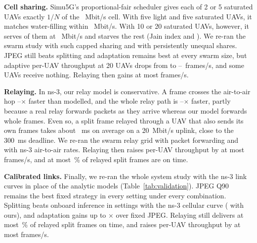 \documentclass[journal,twocolumn,10pt]{IEEEtran}
\begin{document}
\textbf{Cell sharing.} Simu5G's proportional-fair scheduler gives each of 2 or 5 saturated UAVs exactly $1/N$ of the \ValShareCell~Mbit/s cell. With five light and five saturated UAVs, it matches water-filling within \ValMixedMaxErr~Mbit/s. With 10 or 20 saturated UAVs, however, it serves \ValSharePfServed{} of them at \ValSharePfRate~Mbit/s and starves the rest (Jain index \ValShareJainTen{} and \ValShareJainTwenty). We re-ran the swarm study with such capped sharing and with persistently unequal shares. JPEG still beats splitting and adaptation remains best at every swarm size, but adaptive per-UAV throughput at 20 UAVs drops from \ValShareAdTwentyFair{} to \ValShareAdTwentyMin--\ValShareAdTwentyMax~frames/s, and some UAVs receive nothing. Relaying then gains at most \ValShareRelayGainMax{} frames/s.

\textbf{Relaying.} In ns-3, our relay model is conservative. A frame crosses the air-to-air hop \ValRelayHopMin--\ValRelayHopMax$\times$ faster than modelled, and the whole relay path is \ValRelayPathMin--\ValRelayPathMax$\times$ faster, partly because a real relay forwards packets as they arrive whereas our model forwards whole frames. Even so, a split frame relayed through a UAV that also sends its own frames takes about \ValRelaySplitOwnMs~ms on average on a 20~Mbit/s uplink, close to the 300~ms deadline. We re-ran the swarm relay grid with packet forwarding and with ns-3 air-to-air rates. Relaying then raises per-UAV throughput by at most \ValRelayFwdGainMax{} frames/s, and at most \ValRelayFwdSplitPct\,\% of relayed split frames are on time.

\textbf{Calibrated links.} Finally, we re-ran the whole system study with the ns-3 link curves in place of the analytic models (Table~\ref{tab:validation}). JPEG Q90 remains the best fixed strategy in every setting under every combination. Splitting beats onboard inference in \ValCalLteSplitBeatsOnboard{} settings with the ns-3 cellular curve (\ValCalDefaultSplitBeatsOnboard{} with ours), and adaptation gains up to \ValCalAdaptiveAllMax$\times$ over fixed JPEG. Relaying still delivers at most \ValCalRelaySplitPctMax\,\% of relayed split frames on time, and raises per-UAV throughput by at most \ValCalRelayGainMax{} frames/s.

\begin{table}[t]
\centering
\caption{System-level conclusions with the paper's analytic link models and with link models calibrated to ns-3 (cellular: LTE uplink; A2A: 802.11ax), 16 settings of channel profile and onboard speed, and the swarm grid.}
\label{tab:validation}
{\scriptsize\setlength{\tabcolsep}{4pt}}
\end{table}
\end{document}

